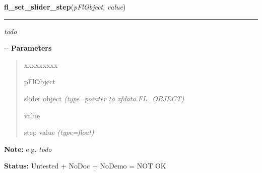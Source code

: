 \hspace{.8\funcindent}\begin{boxedminipage}{\funcwidth}

    \raggedright \textbf{fl\_set\_slider\_step}(\textit{pFlObject}, \textit{value})

    \vspace{-1.5ex}

    \rule{\textwidth}{0.5\fboxrule}
\setlength{\parskip}{2ex}

\emph{todo}

-{}-
\setlength{\parskip}{1ex}
      \textbf{Parameters}
      \vspace{-1ex}

      \begin{quote}
        \begin{Ventry}{xxxxxxxxx}

          \item[pFlObject]


slider object
            {\it (type=pointer to xfdata.FL\_OBJECT)}

          \item[value]


step value
            {\it (type=float)}

        \end{Ventry}

      \end{quote}

\textbf{Note:} 
e.g. \emph{todo}


\textbf{Status:} 
Untested + NoDoc + NoDemo = NOT OK


    \end{boxedminipage}

    \label{xformslib:flslider:fl_set_slider_increment}

    \vspace{0.5ex}

